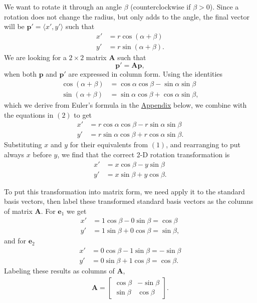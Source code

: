 \documentclass[11pt]{article}
\newcommand{\mat}[1]{\mathbf{#1}}
\renewcommand{\vec}[1]{\mathbf{#1}}
\newcommand{\e}[1]{\mathbf{e}_{#1}}
\begin{document}
We want to rotate it through an angle $\beta$ (counterclockwise if
$\beta > 0$).  Since a rotation does not change the radius, but only
adds to the angle, the final vector will be $\vec{p'} = \langle x', y'
\rangle$ such that
\begin{align*}
x' &= r \cos(\alpha + \beta) \\
y' &= r \sin(\alpha + \beta)\tag{2}.
\end{align*}
We are looking for a $2\times{}2$ matrix $\mat{A}$ such that
\begin{equation*}
\vec{p'} = \mat{A}\vec{p}\tag{3},
\end{equation*}
when both $\vec{p}$ and $\vec{p'}$ are expressed in column form.
Using the identities
\begin{align*}
\cos(\alpha + \beta) &= \cos\alpha \cos\beta - \sin\alpha \sin\beta \\
\sin(\alpha + \beta) &= \sin\alpha \cos\beta + \cos\alpha \sin\beta,
\end{align*}
which we derive from Euler's formula in the \hyperref[sec-3]{Appendix} below, we combine
with the equations in $(2)$ to get
\begin{align*}
x' &= r \cos\alpha \cos\beta - r \sin\alpha \sin\beta \\
y' &= r \sin\alpha \cos\beta + r \cos\alpha \sin\beta.
\end{align*}
Substituting $x$ and $y$ for their equivalents from $(1)$, and
rearranging to put always $x$ before $y$, we find that the correct 2-D
rotation transformation is
\begin{align*}
x' &= x \cos\beta - y \sin\beta \\
y' &= x \sin\beta + y \cos\beta\tag{4}.
\end{align*}

To put this transformation into matrix form, we need apply it to the
standard basis vectors, then label these transformed standard basis
vectors as the columns of matrix $\mat{A}$.  For $\e{1}$ we get
\begin{align*}
x' &= 1 \cos\beta - 0 \sin\beta = \cos\beta \\
y' &= 1 \sin\beta + 0 \cos\beta = \sin\beta,
\end{align*}
and for $\e{2}$
\begin{align*}
x' &= 0 \cos\beta - 1 \sin\beta = -\sin\beta \\
y' &= 0 \sin\beta + 1 \cos\beta = \cos\beta.
\end{align*}
Labeling these results as columns of $\mat{A}$,
\begin{align*}
\mat{A} = \begin{bmatrix}
\cos\beta & -\sin\beta \\
\sin\beta & \cos\beta
\end{bmatrix}.
\end{align*}
\end{document}
